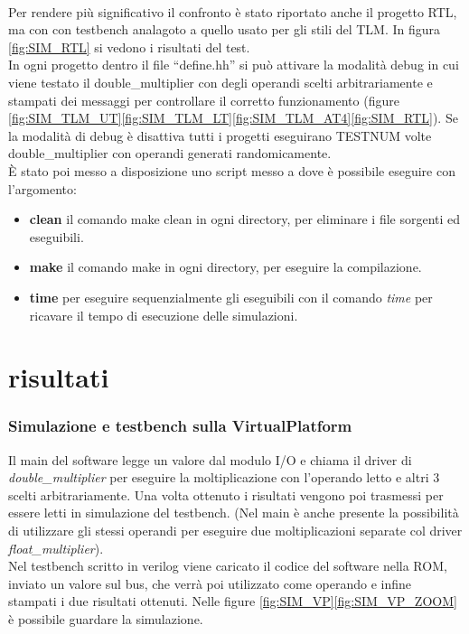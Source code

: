 \documentclass[]{IEEEtran}
\begin{document}
\\Per rendere più significativo il confronto è stato riportato anche il progetto RTL, ma con con testbench analagoto a quello usato per gli stili del TLM. In figura \ref{fig:SIM_RTL} si vedono i risultati del test.
\\In ogni progetto dentro il file ``define.hh'' si può attivare la modalità debug in cui viene testato il double\_multiplier con degli operandi scelti arbitrariamente e stampati dei messaggi per controllare il corretto funzionamento (figure \ref{fig:SIM_TLM_UT}\ref{fig:SIM_TLM_LT}\ref{fig:SIM_TLM_AT4}\ref{fig:SIM_RTL}). Se la modalità di debug è disattiva tutti i progetti eseguirano TESTNUM volte double\_multiplier con operandi generati randomicamente.
\\È stato poi messo a disposizione uno script messo a dove è possibile eseguire con l'argomento:
\begin{itemize}
    \item \textbf{clean} il comando make clean in ogni directory, per eliminare i file sorgenti ed eseguibili.
    \item \textbf{make} il comando make in ogni directory, per eseguire la compilazione.
    \item \textbf{time} per eseguire sequenzialmente gli eseguibili con il comando \textit{time} per ricavare il tempo di esecuzione delle simulazioni.
\end{itemize}



\section{risultati}

\subsubsection{Simulazione e testbench sulla VirtualPlatform}
Il main del software legge un valore dal modulo I/O e chiama il driver di \textit{double\_multiplier} per eseguire la moltiplicazione con l'operando letto e altri 3 scelti arbitrariamente. Una volta ottenuto i risultati vengono poi trasmessi per essere letti in simulazione del testbench. (Nel main è anche presente la possibilità di utilizzare gli stessi operandi per eseguire due moltiplicazioni separate col driver \textit{float\_multiplier}).
\\Nel testbench scritto in verilog viene caricato il codice del software nella ROM, inviato un valore sul bus, che verrà poi utilizzato come operando e infine stampati i due risultati ottenuti. Nelle figure \ref{fig:SIM_VP}\ref{fig:SIM_VP_ZOOM} è possibile guardare la simulazione.
\end{document}
